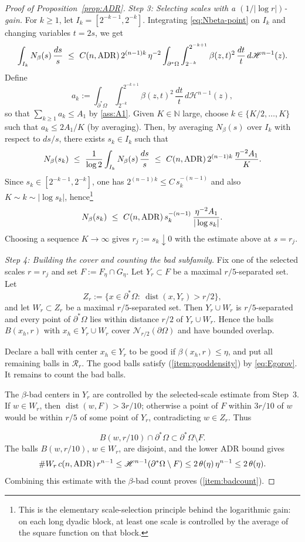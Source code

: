 \documentclass[reqno,11pt]{amsart}
\newcommand{\Ncal}{\mathcal{N}}
\def\dist{{\mathop\mathrm{dist}}}
\numberwithin{equation}{section}
\theoremstyle{remark}
\begin{document}
\begin{proof}[Proof of Proposition~\ref{prop:ADR}]
\smallskip
\noindent\emph{Step 3: Selecting scales with a $(1/|\log r|)$-gain.}
For $k\ge 1$, let $I_k=[2^{-k-1},2^{-k}]$. Integrating \eqref{eq:Nbeta-point} on $I_k$ and changing variables $t=2s$, we get
\[
  \int_{I_k} N_\beta(s)\,\frac{ds}{s}
  \ \le\ C(n,{\rm ADR})\,2^{(n-1)k}\,\eta^{-2}\int_{\partial^*\Omega}\int_{2^{-k}}^{2^{-k+1}}\beta(z,t)^2\,\frac{dt}{t}\,d\mathscr H^{n-1}(z).
\]
Define
\[
a_k:=\int_{\partial^*\Omega}\int_{2^{-k}}^{2^{-k+1}}\beta(z,t)^2\,\frac{dt}{t}\,d\mathscr H^{n-1}(z),
\]
so that $\sum_{k\ge1}a_k\le A_1$ by \eqref{ass:A1}.
Given $K\in\mathbb N$ large, choose $k\in\{K/2,\dots,K\}$ such that $a_k\le 2A_1/K$ (by averaging).
Then, by averaging $N_\beta(s)$ over $I_k$ with respect to $ds/s$, there exists $s_k\in I_k$ such that
\[
  N_\beta(s_k)\ \le\ \frac{1}{\log 2}\int_{I_k} N_\beta(s)\,\frac{ds}{s}
  \ \le\ C(n,{\rm ADR})\,2^{(n-1)k}\,\frac{\eta^{-2}A_1}{K}.
\]
Since $s_k\in[2^{-k-1},2^{-k}]$, one has $2^{(n-1)k}\le C\,s_k^{-(n-1)}$ and also $K\sim k\sim |\log s_k|$, hence\footnote{		{This is the elementary scale-selection principle behind the logarithmic gain: on each long dyadic block,
		at least one scale is controlled by the average of the square function on that block.}}
\[
  N_\beta(s_k)\ \le\ C(n,{\rm ADR})\,s_k^{-(n-1)}\,\frac{\eta^{-2}A_1}{|\log s_k|}.
		\]
{Choosing a sequence $K\to\infty$ gives $r_j:=s_k\downarrow0$ with the estimate above at $s=r_j$.}

\smallskip
\noindent\emph{{Step 4: Building the cover and counting the bad subfamily.}}
{Fix one of the selected scales $r=r_j$ and set $F:=F_\eta\cap G_\eta$. Let $Y_r\subset F$ be a maximal $r/5$-separated set. Let}
\[
{
Z_r:=\{x\in\partial^*\Omega:\ \dist(x,Y_r)>r/2\},
}
\]
{and let $W_r\subset Z_r$ be a maximal $r/5$-separated set. Then $Y_r\cup W_r$ is $r/5$-separated and every point of
$\partial^*\Omega$ lies within distance $r/2$ of $Y_r\cup W_r$. Hence the balls $B(x_h,r)$ with
$x_h\in Y_r\cup W_r$ cover $\Ncal_{r/2}(\partial\Omega)$ and have bounded overlap.}

{Declare a ball with center $x_h\in Y_r$ to be good if $\beta(x_h,r)\le\eta$, and put all remaining balls in
$\mathcal R_r$. The good balls satisfy (\ref{item:gooddensity}) by \eqref{eq:Egorov}. It remains to count the bad balls.

The $\beta$-bad centers in $Y_r$ are controlled by the selected-scale estimate from Step~3. If $w\in W_r$, then
$\dist(w,F)>3r/10$; otherwise a point of $F$ within $3r/10$ of $w$ would be within $r/5$ of some point of $Y_r$, contradicting
$w\in Z_r$. Thus}
\[
{
B(w,r/10)\cap\partial^*\Omega\subset \partial^*\Omega\setminus F .
}
\]
{The balls $B(w,r/10)$, $w\in W_r$, are disjoint, and the lower ADR bound gives}
\[
{
\#W_r\,c(n,{\rm ADR})\,r^{n-1}
\le \mathscr H^{n-1}(\partial^*\Omega\setminus F)
\le 2\,\theta(\eta)\,\eta^{n-1}
\le 2\,\theta(\eta).
}
\]
{Combining this estimate with the $\beta$-bad count proves (\ref{item:badcount}).}
\end{proof}
\end{document}

